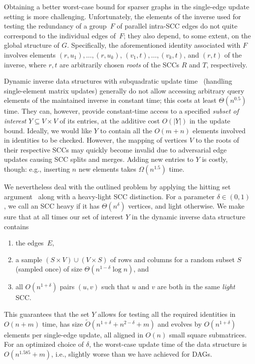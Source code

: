 \documentclass[11pt]{article}
\begin{document}
Obtaining a better worst-case bound for sparser graphs in the single-edge update setting is more challenging.
Unfortunately, the elements of the inverse used for testing the redundancy of a group~$F$ of parallel intra-SCC edges do not quite correspond to the individual edges of~$F$; they also depend, to some extent, on the global structure of $G$. Specifically, the aforementioned identity associated with $F$ involves elements $(r,u_1),\ldots,(r,u_k)$, $(v_1,t),\ldots,(v_k,t)$, and $(r,t)$ of the inverse, where $r,t$ are arbitrarily chosen \emph{roots} of the SCCs $R$ and $T$, respectively.

Dynamic inverse data structures with subquadratic update time~\cite{BrandNS19, Sankowski04} (handling single-element matrix updates) generally do not allow accessing arbitrary query elements of the maintained inverse in constant time; this costs at least $\Theta(n^{0.5})$ time.
They can, however, provide constant-time access to a specified \emph{subset of interest} $Y\subseteq V\times V$ of its entries, at the additive cost $O(|Y|)$ in the update bound. Ideally, we would like $Y$ to contain all the $O(m+n)$ elements involved in identities to be checked. However, the mapping of vertices $V$ to the roots of their respective SCCs may quickly become invalid due to adversarial edge updates causing SCC splits and merges. Adding new entries to $Y$ is costly, though: e.g., inserting $n$ new elements takes $\Omega(n^{1.5})$ time.

We nevertheless deal with the outlined problem by applying the hitting set argument~\cite{UY91} along with a heavy-light SCC distinction.
For a parameter $\delta\in (0,1)$, we call an SCC  heavy if it has $\Theta(n^{\delta})$ vertices, and light otherwise.
We make sure that at all times our set of interest $Y$ in the dynamic inverse data structure contains
\begin{enumerate}[label=(\arabic*),topsep=3pt]
\item the edges~$E$,
\item a sample $(S\times V)\cup (V\times S)$ of rows and columns for a random subset $S$ (sampled once) of size $\Theta(n^{1-\delta}\log{n})$, and 
\item all $O(n^{1+\delta})$ pairs $(u,v)$ such that $u$ and $v$ are both in the same \emph{light} SCC.
\end{enumerate}
This guarantees that the set $Y$ allows for testing all the required identities in $O(n+m)$ time, has size $\tilde{O}(n^{1+\delta}+n^{2-\delta}+m)$ and evolves by $O(n^{1+\delta})$ elements per single-edge update, all aligned in $O(n)$ small square submatrices. For an optimized choice of $\delta$, the worst-case update time of the data structure is $O(n^{1.585}+m)$, i.e., slightly worse than we have achieved for DAGs.
\end{document}
